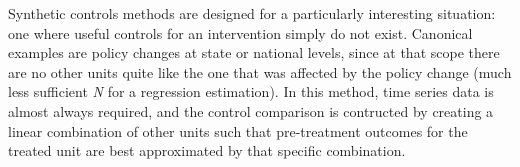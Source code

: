 Synthetic controls methods\cite{abadie2015comparative}
are designed for a particularly interesting situation:
one where useful controls for an intervention simply do not exist.
Canonical examples are policy changes at state or national levels,
since at that scope there are no other units quite like
the one that was affected by the policy change
(much less sufficient \textit{N} for a regression estimation).\cite{gobillon2016regional}
In this method, time series data is almost always required,
and the control comparison is contructed by creating
a linear combination of other units such that pre-treatment outcomes
for the treated unit are best approximated by that specific combination.
